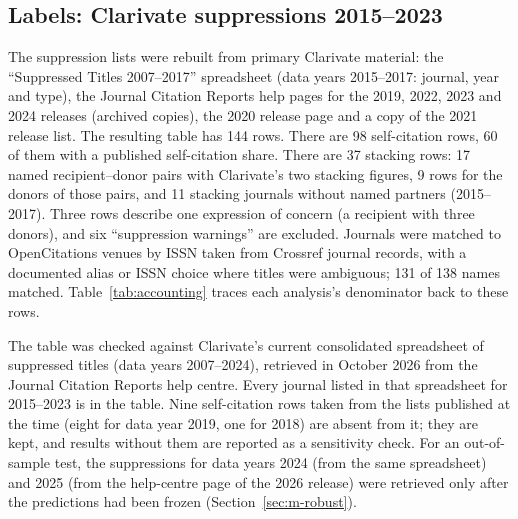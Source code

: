 \subsection{Labels: Clarivate suppressions 2015--2023}
The suppression lists were rebuilt from primary Clarivate material: the ``Suppressed Titles 2007--2017'' spreadsheet
(data years 2015--2017: journal, year and type), the Journal Citation Reports help pages for the 2019, 2022, 2023 and
2024 releases (archived copies), the 2020 release page and a copy of the 2021 release list. The resulting table has 144
rows. There are 98 self-citation rows, 60 of them with a published self-citation share. There are 37 stacking rows:
17 named recipient--donor pairs with Clarivate's two stacking figures, 9 rows for the donors of those pairs, and 11
stacking journals without named partners (2015--2017). Three rows describe one expression of concern (a recipient
with three donors), and six ``suppression warnings'' are excluded. Journals were matched to OpenCitations venues by ISSN taken
from Crossref journal records, with a documented alias or ISSN choice where titles were ambiguous; 131 of 138 names
matched. Table~\ref{tab:accounting} traces each analysis's denominator back to these rows.

The table was checked against Clarivate's current consolidated spreadsheet of suppressed titles (data years
2007--2024), retrieved in October 2026 from the Journal Citation Reports help centre. Every journal listed in that
spreadsheet for 2015--2023 is in the table. Nine self-citation rows taken from the lists published at the time (eight
for data year 2019, one for 2018) are absent from it; they are kept, and results without them are reported as a sensitivity check. For an out-of-sample test, the suppressions for data years 2024 (from the same spreadsheet) and 2025
(from the help-centre page of the 2026 release) were retrieved only after the predictions had been frozen (Section~\ref{sec:m-robust}).


